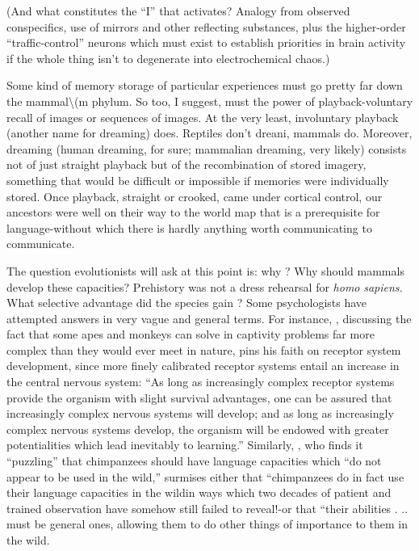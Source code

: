 (And what constitutes the ``I'' that activates? Analogy from observed conspecifics, use of mirrors and other reflecting substances, plus the higher-order ``traffic-control'' neurons which must exist to establish priorities in brain activity if the whole thing isn't to degen\-erate into electrochemical chaos.)

Some kind of memory storage of particular experiences must go pretty far down the mammal{\textbackslash}(m phylum. So too, I suggest, must
the power of playback-voluntary recall of images or sequences of images. At the very least, involuntary playback (another name for dreaming) does. Reptiles don't dreani, mammals do. Moreover, dream\-ing (human dreaming, for sure; mammalian dreaming, very likely) consists not of just straight playback but of the recombination of stored imagery, something that would be difficult or impossible if memories were individually stored. Once playback, straight or crooked, came under cortical control, our ancestors were well on their way to the world map that is a prerequisite for language-without which there is hardly anything worth communicating to communicate.

The question evolutionists will ask at this point is: why ? Why should mammals develop these capacities? Prehistory was not a dress rehearsal for \textit{homo} \textit{sapiens.} What selective advantage did the species gain ? Some psychologists have attempted answers in very vague and general terms. For instance, \citet{Harlow1958}, discussing the fact that some apes and monkeys can solve in captivity problems far more complex than they would ever meet in nature, pins his faith on receptor system development, since more finely calibrated receptor systems entail an increase in the central nervous system: ``As long as increas\-ingly complex receptor systems provide the organism with slight survival advantages, one can be assured that increasingly complex nervous systems will develop; and as long as increasingly complex
nervous systems develop, the organism will be endowed with greater
potentialities which lead inevitably to learning.'' Similarly, \citet{Passingham1979}, who finds it ``puzzling'' that chimpanzees should have language capacities which ``do not appear to be used in the wild,'' surmises either that ``chimpanzees do in fact use their language capacities in the wild{\textquotedbl}\-in ways which two decades of patient and trained observation have somehow still failed to reveal!{}-or that ``their abilities . .. must be general ones, allowing them to do other things of importance to them in the wild.{\textquotedbl}

